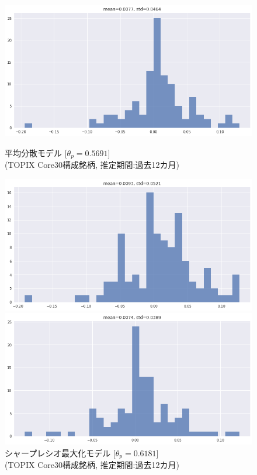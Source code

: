 \documentclass[dvipdfmx,autodetect-engine]{jsarticle}
\begin{document}
\begin{figure}[htbp]
\begin{minipage}{0.5\hsize}
\begin{center}
\includegraphics[width=1.0\hsize]{./figures/mmvp_tpx30_w=12_hist.png}
\end{center}
\caption{平均分散モデル [$\theta_p=0.5691$]\\(TOPIX Core30構成銘柄, 推定期間:過去12カ月)}
\label{fig:11}
\end{minipage}
\begin{minipage}{0.5\hsize}
\begin{center}
\includegraphics[width=1.0\hsize]{./figures/srmp_tpx30_w=12_hist.png}
\end{center}
\caption{シャープレシオ最大化モデル [$\theta_p=0.6181$]\\(TOPIX Core30構成銘柄, 推定期間:過去12カ月)}
\label{fig:12}
\end{minipage}
\begin{minipage}{0.5\hsize}
\begin{center}
\includegraphics[width=1.0\hsize]{./figures/mmvp_tpx30_w=36_hist.png}

\end{center}
\end{minipage}
\end{figure}
\end{document}

